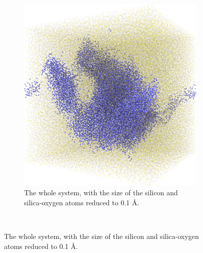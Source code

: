 \begin{figure}[!p]
{        \begin{subfigure}[t]{\myfigwidth}%
            \centering%
            \includegraphics[width=\textwidth]{images/systems/trimmed-rough_fracture03_05}%
            \caption{The whole system, with the size of the silicon and silica-oxygen atoms reduced to 0.1 \AA.}%
        \end{subfigure}%
    }%
    \vspace{10pt}\\%
\end{figure}
